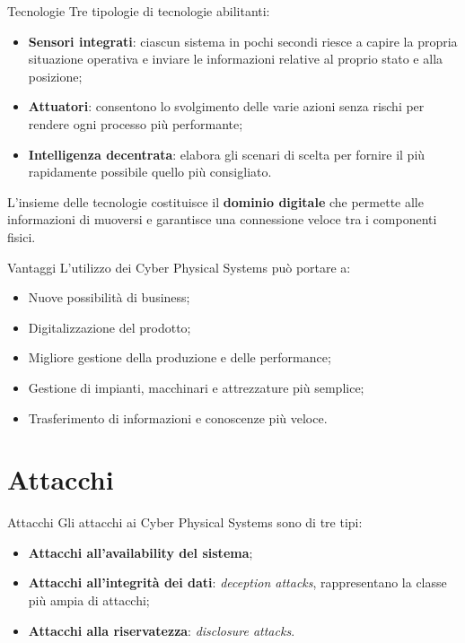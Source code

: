 \documentclass{beamer}
\begin{document}
\begin{frame}{Tecnologie}
Tre tipologie di tecnologie abilitanti:
\begin{itemize}
    \item \textbf{Sensori integrati}: ciascun sistema in pochi secondi riesce a capire la propria situazione operativa e inviare le informazioni relative al 
    proprio stato e alla posizione;
    \item \textbf{Attuatori}: consentono lo svolgimento delle varie azioni senza rischi per rendere ogni processo più performante;
    \item \textbf{Intelligenza decentrata}: elabora gli scenari di scelta per fornire il più rapidamente possibile quello più consigliato.
\end{itemize}

L'insieme delle tecnologie costituisce il \textbf{dominio digitale} che permette alle informazioni di muoversi e garantisce una connessione veloce tra i 
componenti fisici.

\end{frame}

\begin{frame}{Vantaggi}
L'utilizzo dei Cyber Physical Systems può portare a:
\begin{itemize}
    \item Nuove possibilità di business;
    \item Digitalizzazione del prodotto;
    \item Migliore gestione della produzione e delle performance;
    \item Gestione di impianti, macchinari e attrezzature più semplice;
    \item Trasferimento di informazioni e conoscenze più veloce.
\end{itemize}
    
\end{frame}

\section{Attacchi}

\begin{frame}{Attacchi}
Gli attacchi ai Cyber Physical Systems sono di tre tipi:
\begin{itemize}
    \item \textbf{Attacchi all'availability del sistema}; 
    \item \textbf{Attacchi all'integrità dei dati}: \textit{deception attacks}, rappresentano la classe più ampia di attacchi;
    \item \textbf{Attacchi alla riservatezza}: \textit{disclosure attacks}.
\end{itemize}

\end{frame}
\end{document}

